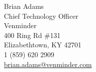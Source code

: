 Brian Adams
\\ Chief Technology Officer
\\ Venminder
\\ 400 Ring Rd \#131 
\\ Elizabethtown, KY 42701
\\ 1 (859) 620 2909
\\ \href{mailto:brian.adams@venminder.com}{brian.adams@venminder.com}

